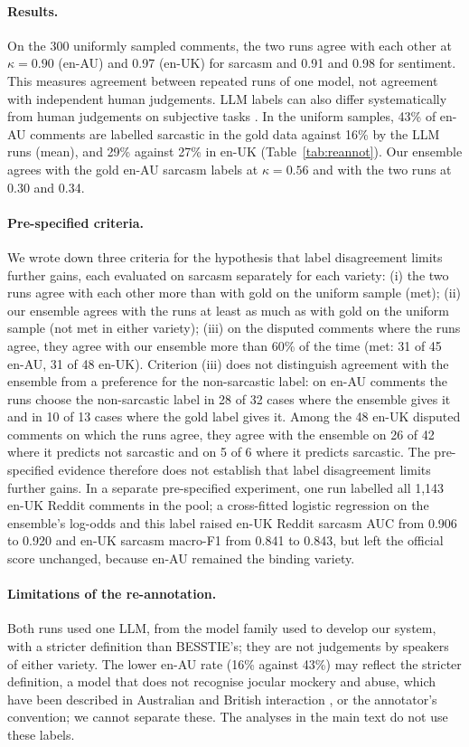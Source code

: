 \documentclass[11pt]{article}
\begin{document}
\paragraph{Results.} On the 300 uniformly sampled comments, the two runs agree with each other at $\kappa=0.90$ (en-AU) and 0.97 (en-UK) for sarcasm and 0.91
and 0.98 for sentiment. This measures agreement between repeated runs of one model, not agreement with independent human
judgements. LLM labels can also differ systematically from human judgements on subjective
tasks \citep{pavlovic-poesio-2024-effectiveness}. In the uniform samples, 43\% of en-AU comments are labelled sarcastic
in the gold data against 16\% by the LLM runs (mean), and 29\% against 27\% in en-UK (Table~\ref{tab:reannot}). Our
ensemble agrees with the gold en-AU sarcasm labels at $\kappa=0.56$ and with the two runs at 0.30 and 0.34.

\paragraph{Pre-specified criteria.} We wrote down three criteria for the hypothesis that label
disagreement limits further gains, each evaluated on sarcasm separately for each variety: (i) the two runs agree with
each other more than with gold on the uniform sample (met); (ii) our ensemble agrees with the runs at least as much as with gold on the uniform sample (not
met in either variety); (iii) on the disputed comments where the runs agree, they agree with our ensemble more than 60\% of the
time (met: 31 of 45 en-AU, 31 of 48 en-UK). Criterion (iii) does not distinguish agreement with the ensemble from a
preference for the non-sarcastic label: on en-AU comments the runs choose the non-sarcastic label in
28 of 32 cases where the ensemble gives it and in 10 of 13 cases where the gold label gives it. Among the 48 en-UK
disputed comments on which the runs agree, they agree with the ensemble on 26 of 42 where it predicts not sarcastic and
on 5 of 6 where it predicts sarcastic. The pre-specified evidence therefore
does not establish that label disagreement limits further gains. In a separate pre-specified experiment, one run labelled all 1,143 en-UK Reddit
comments in the pool; a cross-fitted logistic regression on the ensemble's log-odds and this label raised en-UK Reddit sarcasm AUC from 0.906 to 0.920 and en-UK sarcasm macro-F1 from 0.841 to 0.843, but left the official
score unchanged, because en-AU remained the binding variety.

\paragraph{Limitations of the re-annotation.} Both runs used one LLM, from the model family used to develop our system,
with a stricter definition than BESSTIE's; they are not judgements by speakers of either variety. The lower en-AU rate
(16\% against 43\%) may reflect the stricter definition, a model that does not recognise jocular mockery and abuse,
which have been described in Australian and British interaction \citep{haugh2012mock}, or the annotator's convention;
we cannot separate these. The analyses in the main text do not use these labels.
\end{document}
